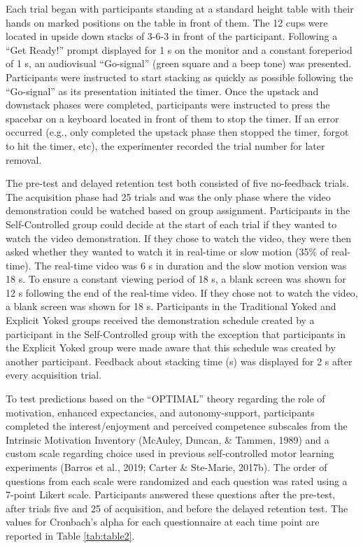 \documentclass[
  english,
  man, donotrepeattitle,floatsintext]{apa7}
\begin{document}
Each trial began with participants standing at a standard height table with their hands on marked positions on the table in front of them. The 12 cups were located in upside down stacks of 3-6-3 in front of the participant. Following a ``Get Ready!'' prompt displayed for 1 s on the monitor and a constant foreperiod of 1 s, an audiovisual ``Go-signal'' (green square and a beep tone) was presented. Participants were instructed to start stacking as quickly as possible following the ``Go-signal'' as its presentation initiated the timer. Once the upstack and downstack phases were completed, participants were instructed to press the spacebar on a keyboard located in front of them to stop the timer. If an error occurred (e.g., only completed the upstack phase then stopped the timer, forgot to hit the timer, etc), the experimenter recorded the trial number for later removal.

The pre-test and delayed retention test both consisted of five no-feedback trials. The acquisition phase had 25 trials and was the only phase where the video demonstration could be watched based on group assignment. Participants in the Self-Controlled group could decide at the start of each trial if they wanted to watch the video demonstration. If they chose to watch the video, they were then asked whether they wanted to watch it in real-time or slow motion (35\% of real-time). The real-time video was 6 s in duration and the slow motion version was 18 s. To ensure a constant viewing period of 18 s, a blank screen was shown for 12 s following the end of the real-time video. If they chose not to watch the video, a blank screen was shown for 18 s. Participants in the Traditional Yoked and Explicit Yoked groups received the demonstration schedule created by a participant in the Self-Controlled group with the exception that participants in the Explicit Yoked group were made aware that this schedule was created by another participant. Feedback about stacking time (s) was displayed for 2 s after every acquisition trial.

To test predictions based on the ``OPTIMAL'' theory regarding the role of motivation, enhanced expectancies, and autonomy-support, participants completed the interest/enjoyment and perceived competence subscales from the Intrinsic Motivation Inventory (McAuley, Duncan, \& Tammen, 1989) and a custom scale regarding choice used in previous self-controlled motor learning experiments (Barros et al., 2019; Carter \& Ste-Marie, 2017b). The order of questions from each scale were randomized and each question was rated using a 7-point Likert scale. Participants answered these questions after the pre-test, after trials five and 25 of acquisition, and before the delayed retention test. The values for Cronbach's alpha for each questionnaire at each time point are reported in Table \ref{tab:table2}.
\end{document}
